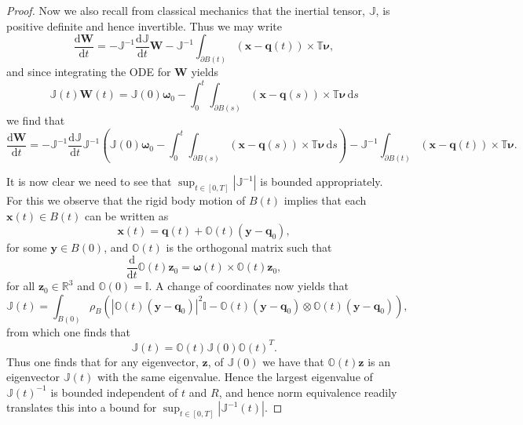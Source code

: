 \documentclass[a4paper]{amsart}
\numberwithin{equation}{section}
\theoremstyle{plain}
\newcommand{\mbf}[1]{\mathbf{#1}}
\newcommand{\mbb}[1]{\mathbb{#1}}
\begin{document}
\begin{proof}
    Now we also recall from classical mechanics that the inertial tensor, $\mbb{J}$, is positive definite and hence invertible.
    Thus we may write
    \[\frac{\mathrm{d}\mbf{W}}{\mathrm{d}t} = -\mbb{J}^{-1}\frac{\mathrm{d} \mbb{J}}{\mathrm{d}t} \mbf{W} - \mbb{J}^{-1}\int_{\partial B(t)} (\mbf{x} - \mbf{q}(t)) \times \mbb{T} \boldsymbol{\nu},\]
    and since integrating the ODE for $\mbf{W}$ yields
    \[ \mbb{J}(t) \mbf{W}(t) = \mbb{J}(0) \boldsymbol{\omega}_0 - \int_0^t \int_{\partial B(s)} (\mbf{x} - \mbf{q}(s)) \times \mbb{T} \boldsymbol{\nu} \, \mathrm{d}s \]
    we find that
    \[ \frac{\mathrm{d}\mbf{W}}{\mathrm{d}t} = -\mbb{J}^{-1}\frac{\mathrm{d} \mbb{J}}{\mathrm{d}t} \mbb{J}^{-1}\left(\mbb{J}(0) \boldsymbol{\omega}_0 - \int_0^t \int_{\partial B(s)} (\mbf{x} - \mbf{q}(s)) \times \mbb{T} \boldsymbol{\nu} \, \mathrm{d}s\right) - \mbb{J}^{-1}\int_{\partial B(t)} (\mbf{x} - \mbf{q}(t)) \times \mbb{T} \boldsymbol{\nu}. \]

    It is now clear we need to see that $\sup_{t \in [0,T]} |\mbb{J}^{-1}|$ is bounded appropriately.
    For this we observe that the rigid body motion of $B(t)$ implies that each $\mbf{x}(t) \in  B(t)$ can be written as
    \[ \mbf{x}(t) = \mbf{q}(t) + \mbb{O}(t)(\mbf{y} - \mbf{q}_0), \]
    for some $\mbf{y} \in B(0)$, and $\mbb{O}(t)$ is the orthogonal matrix such that
    \[\frac{\mathrm{d}}{\mathrm{d}t} \mbb{O}(t)\mbf{z}_0 = \boldsymbol{\omega}(t) \times \mbb{O}(t) \mbf{z}_0,\]
    for all $\mbf{z}_0 \in \mbb{R}^3$ and $\mbb{O}(0) = \mbb{I}$.
    A change of coordinates now yields that
    \[ \mbb{J}(t) = \int_{B(0)} \rho_B \left(|\mbb{O}(t)(\mbf{y}-\mbf{q}_0)|^2 \mbb{I} - \mbb{O}(t)(\mbf{y}-\mbf{q}_0) \otimes \mbb{O}(t)(\mbf{y}-\mbf{q}_0)\right), \]
    from which one finds that
    \[ \mbb{J}(t) = \mbb{O}(t) \mbb{J}(0) \mbb{O}(t)^T. \]
    Thus one finds that for any eigenvector, $\mbf{z}$, of $\mbb{J}(0)$ we have that $\mbb{O}(t)\mbf{z}$ is an eigenvector $\mbb{J}(t)$ with the same eigenvalue.
    Hence the largest eigenvalue of $\mbb{J}(t)^{-1}$ is bounded independent of $t$ and $R$, and hence norm equivalence readily translates this into a bound for $\sup_{t \in [0,T]}|\mbb{J}^{-1}(t)|$.

\end{proof}
\end{document}
